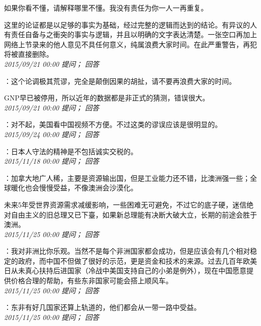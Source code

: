 \documentclass[twocolumn]{ctexart}
\begin{document}
如果你看不懂，请解释哪里不懂。我没有责任为你一人一再重复。

这里的论证都是以足够的事实为基础，经过完整的逻辑而达到的结论。有异议的人有责任自备与之衝突的事实与逻辑，并且以明确的文字表达清楚。一张空口再加上网络上节录来的他人意见不具任何意义，纯属浪费大家时间。在此严重警告，再犯将被直接删除。\\

\textit{\hfill\noindent\small 2015/09/21 00:00 提问； 回答}

：这个论调极其荒谬，完全是颠倒因果的胡扯，请不要再浪费大家的时间。

GNP早已被停用，所以近年的数据都是非正式的猜测，错误很大。\\

\textit{\hfill\noindent\small 2015/09/21 00:00 提问； 回答}

：对不起，美国看中国视频不方便。不过这类的谬误应该是很明显的。\\

\textit{\hfill\noindent\small 2015/09/24 00:00 提问； 回答}

：日本人守法的精神是不包括诚实交税的。\\

\textit{\hfill\noindent\small 2015/11/18 00:00 提问； 回答}

：加拿大地广人稀，主要是资源输出国，但是工业能力还不错，比澳洲强一些；全球暖化也会慢慢受益，不像澳洲会沙漠化。

未来5年受世界资源需求减缓影响，一些困难无可避免，不过它的底子硬，迷信绝对自由主义的旧总理又已下臺，如果新总理能有决断大破大立，长期的前途会胜于澳洲。\\

\textit{\hfill\noindent\small 2015/11/25 00:00 提问； 回答}

：我对非洲比你乐观。当然不是每个非洲国家都会成功，但是应该会有几个相对稳定的政府，而中国不但做了很好的示范，更是资金和技术的来源。过去几百年欧美日从未真心扶持后进国家（冷战中美国支持自己的小弟是例外），现在中国愿意提供价格合理的帮助，有些东非国家可能会搭上顺风车。\\

\textit{\hfill\noindent\small 2015/11/25 00:00 提问； 回答}

：东非有好几国家还算上轨道的，他们都会从一带一路中受益。\\

\textit{\hfill\noindent\small 2015/11/25 00:00 提问； 回答}
\end{document}

